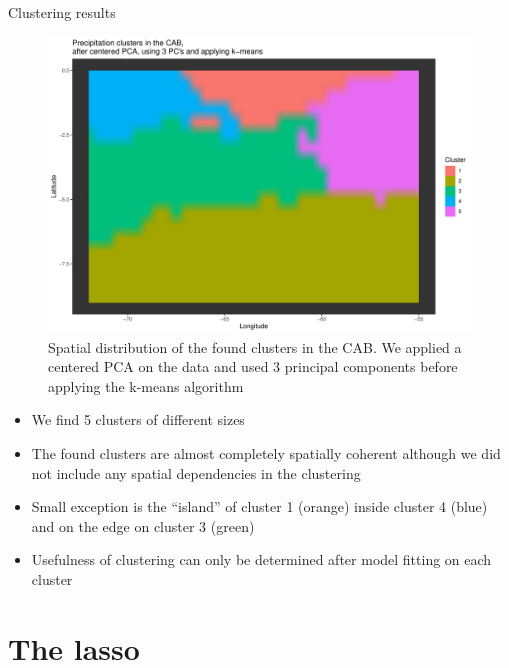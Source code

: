 \documentclass[
  ignorenonframetext,
]{beamer}
\providecommand{\tightlist}{%
  \setlength{\itemsep}{0pt}\setlength{\parskip}{0pt}}
\begin{document}
\begin{frame}{Clustering results}
\protect\hypertarget{clustering-results}{}
\begin{figure}

{\centering \includegraphics[width=0.5\linewidth]{ma-presentation_files/figure-beamer/cluster-map-1} 

}

\caption{Spatial distribution of the found clusters in the CAB. We applied a centered PCA on the data and used 3 principal components before applying the k-means algorithm}\label{fig:cluster-map}
\end{figure}

\begin{itemize}
\tightlist
\item
  We find 5 clusters of different sizes
\item
  The found clusters are almost completely spatially coherent although
  we did not include any spatial dependencies in the clustering
\item
  Small exception is the ``island'' of cluster 1 (orange) inside cluster
  4 (blue) and on the edge on cluster 3 (green)
\item
  Usefulness of clustering can only be determined after model fitting on
  each cluster
\end{itemize}
\end{frame}

\hypertarget{the-lasso}{%
\section{The lasso}\label{the-lasso}}
\end{document}
